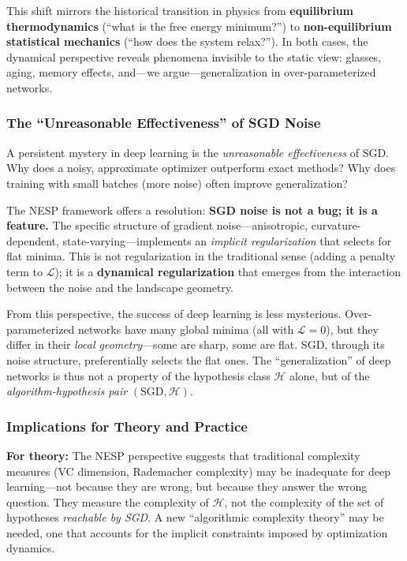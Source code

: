 \documentclass[
  journal=largetwo,
  year=2025,
  volume=37,
]{cup-journal}
\begin{document}
This shift mirrors the historical transition in physics from \textbf{equilibrium thermodynamics} (``what is the free energy minimum?'') to \textbf{non-equilibrium statistical mechanics} (``how does the system relax?''). In both cases, the dynamical perspective reveals phenomena invisible to the static view: glasses, aging, memory effects, and---we argue---generalization in over-parameterized networks.

\subsubsection{The ``Unreasonable Effectiveness'' of SGD Noise}

A persistent mystery in deep learning is the \textit{unreasonable effectiveness} of SGD. Why does a noisy, approximate optimizer outperform exact methods? Why does training with small batches (more noise) often improve generalization?

The NESP framework offers a resolution: \textbf{SGD noise is not a bug; it is a feature.} The specific structure of gradient noise---anisotropic, curvature-dependent, state-varying---implements an \textit{implicit regularization} that selects for flat minima. This is not regularization in the traditional sense (adding a penalty term to $\mathcal{L}$); it is a \textbf{dynamical regularization} that emerges from the interaction between the noise and the landscape geometry.

From this perspective, the success of deep learning is less mysterious. Over-parameterized networks have many global minima (all with $\mathcal{L} = 0$), but they differ in their \textit{local geometry}---some are sharp, some are flat. SGD, through its noise structure, preferentially selects the flat ones. The ``generalization'' of deep networks is thus not a property of the hypothesis class $\mathcal{H}$ alone, but of the \textit{algorithm-hypothesis pair} $(\text{SGD}, \mathcal{H})$.

\subsubsection{Implications for Theory and Practice}

\textbf{For theory:} The NESP perspective suggests that traditional complexity measures (VC dimension, Rademacher complexity) may be inadequate for deep learning---not because they are wrong, but because they answer the wrong question. They measure the complexity of $\mathcal{H}$, not the complexity of the set of hypotheses \textit{reachable by SGD}. A new ``algorithmic complexity theory'' may be needed, one that accounts for the implicit constraints imposed by optimization dynamics.
\end{document}
